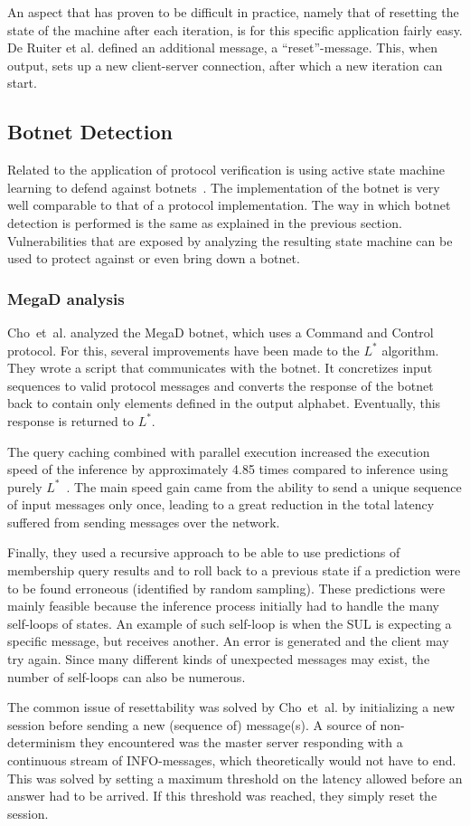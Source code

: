 \documentclass[multi,crop=false,class=article]{standalone}
\begin{document}
An aspect that has proven to be difficult in practice, namely
that of resetting the state of the machine after each iteration, is for this
specific application fairly easy. De Ruiter et al. defined an additional
message, a ``reset''-message. This, when output, sets up a new client-server
connection, after which a new iteration can start.

\subsection{Botnet Detection}
Related to the application of protocol verification is using active state
machine learning to defend against botnets~\cite{Cho2010}. The implementation of
the botnet is very well comparable to that of a protocol implementation. The way
in which botnet detection is performed is the same as explained in the previous
section. Vulnerabilities that are exposed by analyzing the resulting state
machine can be used to protect against or even bring down a botnet.

\subsubsection{MegaD analysis}
Cho~et~al. analyzed the MegaD botnet, which uses a Command and Control protocol.
For this, several improvements have been made to the $L^*$ algorithm.
They wrote a script that communicates with the botnet. It concretizes input
sequences to valid protocol messages and converts the response of the botnet
back to contain only elements defined in the output alphabet. Eventually, this
response is returned to $L^*$.

The query caching combined with parallel execution increased the execution speed
of the inference by approximately 4.85 times compared to inference using purely
$L^*$~\cite{Cho2010}. The main speed gain came from the ability to send
a unique sequence of input messages only once, leading to a great reduction in
the total latency suffered from sending messages over the network.

Finally, they used a recursive approach to be able to use predictions of
membership query results and to roll back to a previous state if a prediction
were to be found erroneous (identified by random sampling). These predictions
were mainly feasible because the inference process initially had to handle the
many self-loops of states. An example of such self-loop is when the SUL is
expecting a specific message, but receives another. An error is generated and
the client may try again. Since many different kinds of unexpected messages may
exist, the number of self-loops can also be numerous.

The common issue of resettability was solved by Cho~et~al. by initializing a
new session before sending a new (sequence of) message(s). A source of
non-determinism they encountered was the master server responding with a
continuous stream of INFO-messages, which theoretically would not have to end.
This was solved by setting a maximum threshold on the latency allowed before an
answer had to be arrived. If this threshold was reached, they simply reset the
session.
\end{document}
